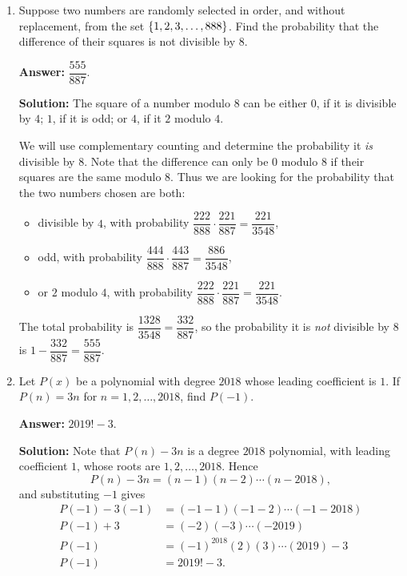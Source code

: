 \documentclass[11pt,paper=letter]{scrartcl}
\begin{document}
\begin{enumerate}[left=0pt]

\item Suppose two numbers are randomly selected in order, and without replacement, from the set $\left\{ 1, 2, 3, \ldots, 888 \right\}$. Find the probability that the difference of their squares is not divisible by $8$.

\textbf{Answer:} $\boxed{\dfrac{555}{887}}$.

\textbf{Solution:} The square of a number modulo $8$ can be either $0$, if it is divisible by $4$; $1$, if it is odd; or $4$, if it $2$ modulo $4$.

We will use complementary counting and determine the probability it \emph{is} divisible by $8$. Note that the difference can only be $0$ modulo $8$ if their squares are the same modulo $8$. Thus we are looking for the probability that the two numbers chosen are both:
\begin{itemize}
  \item divisible by $4$, with probability $\dfrac{222}{888} \cdot \dfrac{221}{887} = \dfrac{221}{3548}$,
  \item odd, with probability $\dfrac{444}{888} \cdot \dfrac{443}{887} = \dfrac{886}{3548}$,
  \item or $2$ modulo $4$, with probability $\dfrac{222}{888} \cdot \dfrac{221}{887} = \dfrac{221}{3548}$.
\end{itemize}
The total probability is $\dfrac{1328}{3548} = \dfrac{332}{887}$, so the probability it is \emph{not} divisible by $8$ is $1 - \dfrac{332}{887} = \dfrac{555}{887}$.

\item Let $P(x)$ be a polynomial with degree $2018$ whose leading coefficient is $1$. If $P(n) = 3n$ for $n = 1, 2, \ldots, 2018$, find $P(-1)$.

\textbf{Answer:} $\boxed{2019! - 3}$.

\textbf{Solution:} Note that $P(n) - 3n$ is a degree $2018$ polynomial, with leading coefficient $1$, whose roots are $1, 2, \ldots, 2018$. Hence $$P(n) - 3n = (n-1)(n-2) \cdots (n-2018),$$ and substituting $-1$ gives \begin{align*}
  P(-1) -3(-1) &= (-1-1)(-1-2)\cdots(-1-2018) \\
  P(-1) + 3 &= (-2)(-3)\cdots(-2019) \\
  P(-1) &= (-1)^{2018}(2)(3)\cdots(2019) - 3\\
  P(-1) &= 2019! - 3.
\end{align*}


\end{enumerate}
\end{document}

